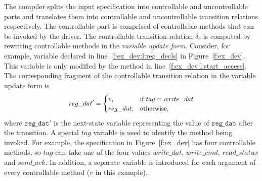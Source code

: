 The \tsl compiler splits the input specification into controllable and uncontrollable parts and translates them into controllable and uncontrollable transition relations respectively.  The controllable part is comprised of controllable methods that can be invoked by the driver.  The controllable transition relation $\delta_c$ is computed by rewriting controllable methods in the \emph{variable update form}.  Consider, for example, variable  declared in line~\ref{f:ex_dev:l:reg_decls} in Figure~\ref{f:ex_dev}.  This variable is only modified by the  method in line~\ref{f:ex_dev:l:start_access}. The corresponding fragment of the controllable transition relation in the variable update form is
$$
\small
\begin{aligned}
    &reg\_dat' = \begin{cases}
                     v       , & \text{if } tag=write\_dat \\
                     reg\_dat, & \text{otherwise},
                 \end{cases}\\
\end{aligned}
$$
where $\mathtt{reg\_dat'}$ is the next-state variable representing the value of $\mathtt{reg\_dat}$ after the transition. A special $tag$ variable is used to identify the method being invoked. For example, the specification in Figure~\ref{f:ex_dev} has four controllable methods, so $tag$ can take one of the four values $write\_dat$, $write\_cmd$, $read\_status$ and $send\_ack$.  In addition, a separate variable is introduced for each argument of every controllable method ($v$ in this example). 

